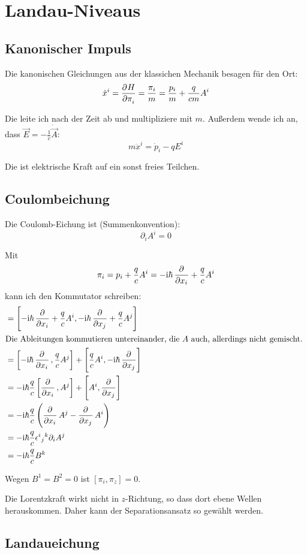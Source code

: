 \section{Landau-Niveaus}

\subsection{Kanonischer Impuls}

Die kanonischen Gleichungen aus der klassichen Mechanik besagen für den Ort:
\[
	\dot x^i = \dpd H{\pi_i} = \frac{\pi_i}m = \frac{p_i}m + \frac q{cm} A^i
\]

Die leite ich nach der Zeit ab und multipliziere mit $m$. Außerdem wende ich
an, dass $\vec E = - \frac 1c \dot{\vec A}$:
\[
	m \ddot x^i = \dot p_i - q E^i
\]

Die ist elektrische Kraft auf ein sonst freies Teilchen.

\subsection{Coulombeichung}

Die Coulomb-Eichung ist (Summenkonvention):
\[
	\partial_i A^i = 0
\]

Mit
\[
	\pi_i = p_i + \frac qc A^i
	= - \ii \hbar \dpd{}{{x_i}} + \frac qc A^i
\]
kann ich den Kommutator schreiben:
\begin{align*}
	[\pi_i, \pi_j]
	&= \sbr{-\ii \hbar \dpd{}{{x_i}} + \frac qc A^i, -\ii \hbar \dpd{}{{x_j}} + \frac qc A^j} \\
	\intertext{%
		Die Ableitungen kommutieren untereinander, die $A$ auch, allerdings
		nicht gemischt.
	}
	&= \sbr{-\ii \hbar \dpd{}{{x_i}}, \frac qc A^j} + \sbr{\frac qc A^i, -\ii \hbar \dpd{}{{x_j}}} \\
	&= -\ii \hbar \frac qc \sbr{\dpd{}{{x_i}}, A^j} + \sbr{A^i, \dpd{}{{x_j}}} \\
	&= - \ii \hbar \frac qc \del{\dpd{}{{x_i}} A^j - \dpd{}{{x_j}} A^i} \\
	&= - \ii \hbar \frac qc \epsilon^i{}_j{}^k \partial_i A^j \\
	&= - \ii \hbar \frac qc B^k
\end{align*}

Wegen $B^1 = B^2 = 0$ ist $[\pi_i, \pi_z] = 0$.

Die Lorentzkraft wirkt nicht in $z$-Richtung, so dass dort ebene Wellen
herauskommen. Daher kann der Separationsansatz so gewählt werden.

\subsection{Landaueichung}
